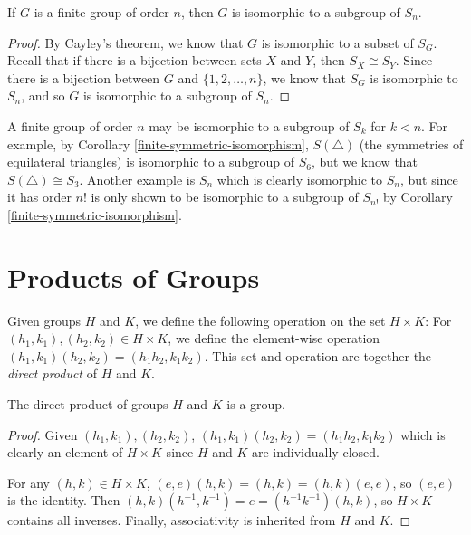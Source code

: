 \documentclass[12pt]{article}
\begin{document}
\begin{cor}\label{finite-symmetric-isomorphism}
    If $G$ is a finite group of order $n$, then $G$ is isomorphic to a subgroup of $S_n$.
\end{cor}

\begin{proof}
    By Cayley's theorem, we know that $G$ is isomorphic to a subset of $S_G$. Recall that if there is a bijection between sets $X$ and $Y$, then $S_X \cong S_Y$. Since there is a bijection between $G$ and $\{1, 2, \ldots, n\}$, we know that $S_G$ is isomorphic to $S_n$, and so $G$ is isomorphic to a subgroup of $S_n$.
\end{proof}

\begin{rmk}
    A finite group of order $n$ may be isomorphic to a subgroup of $S_k$ for $k < n$. For example, by Corollary \ref{finite-symmetric-isomorphism}, $S(\triangle)$ (the symmetries of equilateral triangles) is isomorphic to a subgroup of $S_6$, but we know that $S(\triangle) \cong S_3$. Another example is $S_n$ which is clearly isomorphic to $S_n$, but since it has order $n!$ is only shown to be isomorphic to a subgroup of $S_{n!}$ by Corollary \ref{finite-symmetric-isomorphism}.
\end{rmk}

\section{Products of Groups}

\begin{defn}
    Given groups $H$ and $K$, we define the following operation on the set $H \times K$: For $(h_1, k_1), (h_2, k_2) \in H \times K$, we define the element-wise operation $(h_1, k_1)(h_2, k_2) = (h_1h_2, k_1k_2)$. This set and operation are together the \emph{direct product} of $H$ and $K$.
\end{defn}

\begin{prop}
    The direct product of groups $H$ and $K$ is a group.
\end{prop}

\begin{proof}
    Given $(h_1, k_1), (h_2, k_2)$, $(h_1, k_1)(h_2, k_2) = (h_1h_2, k_1k_2)$ which is clearly an element of $H \times K$ since $H$ and $K$ are individually closed.

    For any $(h, k) \in H \times K$, $(e, e)(h,k) = (h, k) = (h, k)(e, e)$, so $(e, e)$ is the identity. Then $(h, k)(h^{-1}, k^{-1}) = e = (h^{-1}k^{-1})(h, k)$, so $H \times K$ contains all inverses. Finally, associativity is inherited from $H$ and $K$.
\end{proof}
\end{document}
